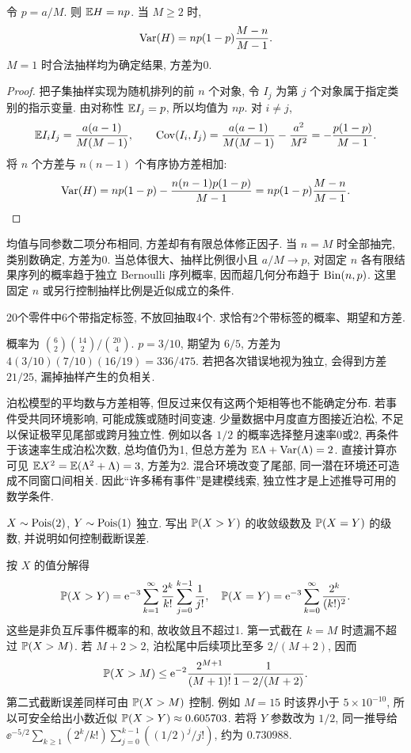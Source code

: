 \begin{proposition}
令 $p=a/M$. 则 $\mathbb E H=np$. 当 $M\ge2$ 时,
\[
\operatorname{Var}(H)=np(1-p)\frac{M-n}{M-1}.
\]
$M=1$ 时合法抽样均为确定结果, 方差为0.
\end{proposition}
\begin{proof}
把子集抽样实现为随机排列的前 $n$ 个对象, 令 $I_j$ 为第 $j$ 个对象属于指定类别的指示变量. 由对称性 $\mathbb E I_j=p$, 所以均值为 $np$. 对 $i\ne j$,
\[
\mathbb E I_iI_j=\frac{a(a-1)}{M(M-1)},\qquad
\operatorname{Cov}(I_i,I_j)=\frac{a(a-1)}{M(M-1)}-\frac{a^2}{M^2}
=-\frac{p(1-p)}{M-1}.
\]
将 $n$ 个方差与 $n(n-1)$ 个有序协方差相加:
\[
\operatorname{Var}(H)=np(1-p)-\frac{n(n-1)p(1-p)}{M-1}
=np(1-p)\frac{M-n}{M-1}.
\]
\end{proof}
均值与同参数二项分布相同, 方差却有有限总体修正因子. 当 $n=M$ 时全部抽完, 类别数确定, 方差为0. 当总体很大、抽样比例很小且 $a/M\to p$, 对固定 $n$ 各有限结果序列的概率趋于独立 Bernoulli 序列概率, 因而超几何分布趋于 $\operatorname{Bin}(n,p)$. 这里固定 $n$ 或另行控制抽样比例是近似成立的条件.

\begin{example}
20个零件中6个带指定标签, 不放回抽取4个. 求恰有2个带标签的概率、期望和方差.
\end{example}
\begin{solution}
概率为 $\binom62\binom{14}2/\binom{20}4$. $p=3/10$, 期望为 $6/5$, 方差为
$4(3/10)(7/10)(16/19)=336/475$. 若把各次错误地视为独立, 会得到方差 $21/25$, 漏掉抽样产生的负相关.
\end{solution}

泊松模型的平均数与方差相等, 但反过来仅有这两个矩相等也不能确定分布. 若事件受共同环境影响, 可能成簇或随时间变速. 少量数据中月度直方图接近泊松, 不足以保证极罕见尾部或跨月独立性. 例如以各 $1/2$ 的概率选择整月速率0或2, 再条件于该速率生成泊松次数, 总均值仍为1, 但总方差为 $\mathbb E\Lambda+\operatorname{Var}(\Lambda)=2$. 直接计算亦可见 $\mathbb E X^2=\mathbb E(\Lambda^2+\Lambda)=3$, 方差为2. 混合环境改变了尾部, 同一潜在环境还可造成不同窗口间相关. 因此“许多稀有事件”是建模线索, 独立性才是上述推导可用的数学条件.

\begin{exercise}
$X\sim\operatorname{Pois}(2)$, $Y\sim\operatorname{Pois}(1)$ 独立. 写出 $\mathbb P(X>Y)$ 的收敛级数及 $\mathbb P(X=Y)$ 的级数, 并说明如何控制截断误差.
\end{exercise}
\begin{solution}
按 $X$ 的值分解得
\[
\mathbb P(X>Y)=\mathrm e^{-3}\sum_{k=1}^\infty\frac{2^k}{k!}\sum_{j=0}^{k-1}\frac1{j!},
\quad
\mathbb P(X=Y)=\mathrm e^{-3}\sum_{k=0}^\infty\frac{2^k}{(k!)^2}.
\]
这些是非负互斥事件概率的和, 故收敛且不超过1. 第一式截在 $k=M$ 时遗漏不超过 $\mathbb P(X>M)$. 若 $M+2>2$, 泊松尾中后续项比至多 $2/(M+2)$, 因而
\[
\mathbb P(X>M)\le\mathrm e^{-2}\frac{2^{M+1}}{(M+1)!}\frac1{1-2/(M+2)}.
\]
第二式截断误差同样可由 $\mathbb P(X>M)$ 控制. 例如 $M=15$ 时该界小于 $5\times10^{-10}$, 所以可安全给出小数近似 $\mathbb P(X>Y)\approx0.605703$. 若将 $Y$ 参数改为 $1/2$, 同一推导给 $\ee^{-5/2}\sum_{k\ge1}(2^k/k!)\sum_{j=0}^{k-1}((1/2)^j/j!)$, 约为 $0.730988$.
\end{solution}

